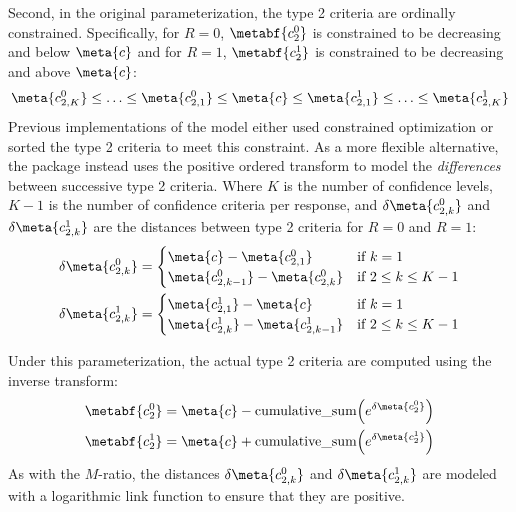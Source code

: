 Second, in the original parameterization, the type 2 criteria are ordinally constrained. Specifically, for $R=0$, $\metabf{c_2^0}$ is constrained to be decreasing and below $\meta{c}$ and for $R=1$, $\metabf{c_2^1}$ is constrained to be decreasing and above $\meta{c}$:
$$\meta{c_{2,K}^0} \le \ldots \le \meta{c_{2,1}^0} \le\meta{c} \le \meta{c_{2,1}^1} \le \ldots \le \meta{c_{2,K}^1}$$
Previous implementations of the model either used constrained optimization \parencite{maniscalco2014} or sorted the type 2 criteria \parencite{fleming2017} to meet this constraint. As a more flexible alternative, the \hmetad{} package instead uses the positive ordered transform to model the \emph{differences} between successive type 2 criteria. Where $K$ is the number of confidence levels, $K-1$ is the number of confidence criteria per response, and $\delta\meta{c_{2,k}^0}$ and $\delta\meta{c_{2,k}^1}$ are the distances between type 2 criteria for $R=0$ and $R=1$:
\begin{align*}
    \delta\meta{c_{2,k}^0} = \begin{cases}
        \meta{c} - \meta{c_{2,1}^0} & \textrm{if } k = 1 \\
        \meta{c_{2,k-1}^0}  - \meta{c_{2,k}^0} & \textrm{if } 2 \le k \le K-1
    \end{cases} \\
    \delta\meta{c_{2,k}^1} = \begin{cases}
        \meta{c_{2,1}^1} - \meta{c} & \textrm{if } k = 1 \\
        \meta{c_{2,k}^1} - \meta{c_{2,k-1}^1} & \textrm{if } 2 \le k \le K-1
    \end{cases}
\end{align*}

Under this parameterization, the actual type 2 criteria are computed using the inverse transform:
\begin{align*}
    \metabf{c_2^0} &= \meta{c} - \textrm{cumulative\_sum}\!\left(e^{\delta\meta{c_2^0}}\right) \\
    \metabf{c_2^1} &= \meta{c} + \textrm{cumulative\_sum}\!\left(e^{\delta\meta{c_2^1}}\right)
\end{align*}
As with the $M$-ratio, the distances $\delta\meta{c_{2,k}^0}$ and $\delta\meta{c_{2,k}^1}$ are modeled with a logarithmic link function to ensure that they are positive.


